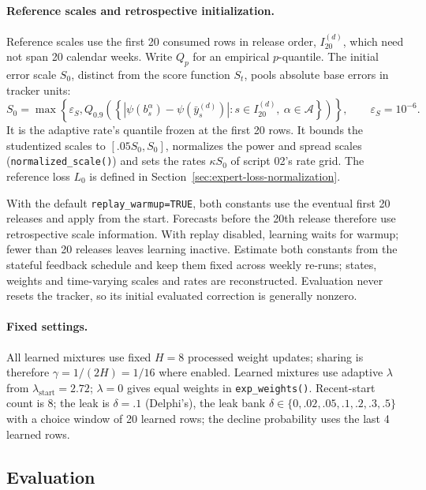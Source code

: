 \documentclass[11pt,a4paper]{article}
\newcommand{\A}{\mathcal{A}}
\theoremstyle{definition}
\theoremstyle{remark}
\begin{document}
\paragraph{Reference scales and retrospective initialization.}
Reference scales use the first 20 consumed rows in release order,
$I_{20}^{(d)}$, which need not span 20 calendar weeks. Write $Q_p$ for an
empirical $p$-quantile. The initial error scale $S_0$, distinct from the
score function $S_t$, pools absolute base errors in tracker units:
\begin{equation}
 S_0=\max\!\left\{\varepsilon_S,
 Q_{0.9}\!\left(\left\{
 |\psi(b_s^\alpha)-\psi(\bar y_s^{(d)})|:
 s\in I_{20}^{(d)},\ \alpha\in\A
 \right\}\right)\right\},\qquad\varepsilon_S=10^{-6}.
 \label{eq:initial-error-scale}
\end{equation}
It is the adaptive rate's quantile frozen at the first 20 rows. It bounds
the studentized scales to $[.05S_0,S_0]$, normalizes the power and spread
scales (\texttt{normalized\_scale()}) and sets the rates $\kappa S_0$ of
script 02's rate grid. The reference loss $L_0$ is defined in
Section~\ref{sec:expert-loss-normalization}.

With the default \texttt{replay\_warmup=TRUE}, both constants use the
eventual first 20 releases and apply from the start. Forecasts before
the 20th release therefore use retrospective scale information.
With replay disabled, learning
waits for warmup; fewer than 20 releases leaves learning inactive.
Estimate both constants from the stateful feedback schedule
and keep them fixed across weekly re-runs; states, weights and time-varying
scales and rates are reconstructed. Evaluation never resets the
tracker, so its initial evaluated correction is generally nonzero.

\paragraph{Fixed settings.}
All learned mixtures use fixed $H=8$ processed weight updates;
sharing is therefore $\gamma=1/(2H)=1/16$ where enabled.
Learned mixtures use adaptive $\lambda$ from $\lambda_{\mathrm{start}}=2.72$;
$\lambda=0$ gives equal weights in \texttt{exp\_weights()}.
Recent-start count is 8; the leak is $\delta=.1$ (Delphi's), the leak bank
$\delta\in\{0,.02,.05,.1,.2,.3,.5\}$ with a choice window of 20 learned
rows; the decline probability uses the last 4 learned rows.

\subsection{Evaluation}
\label{sec:evaluation-design}
\end{document}
